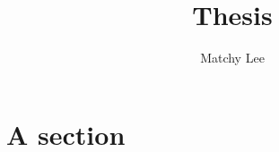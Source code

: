 \documentclass{article}
\title{Thesis}
\author{Matchy Lee}
\begin{document}
\maketitle

\pagebreak

\section{A section}
\end{document}
